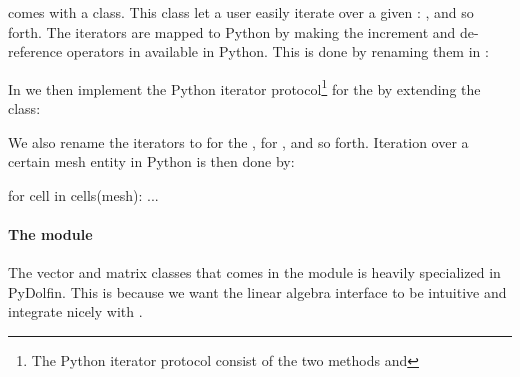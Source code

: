 \dolfin comes with a \-\- class. This class let a user easily iterate over a given : ,  and so forth. The iterators are mapped to Python by making the increment and de-reference operators in  available in Python. This is done by renaming them in :
\begin{c++}
\end{c++}
In  we then implement the Python iterator protocol\footnote{The Python iterator protocol consist of the two methods  and } for the \-\- by extending the class:
We also rename the iterators to  for the ,  for , and so forth. Iteration over a certain mesh entity in Python is then done by:
\begin{python}
for cell in cells(mesh):
    ...
\end{python}

\paragraph{The  module}
The vector and matrix classes that comes in the  module is heavily specialized in PyDolfin. This is because we want the linear algebra interface to be intuitive and integrate nicely with \numpy.\par

